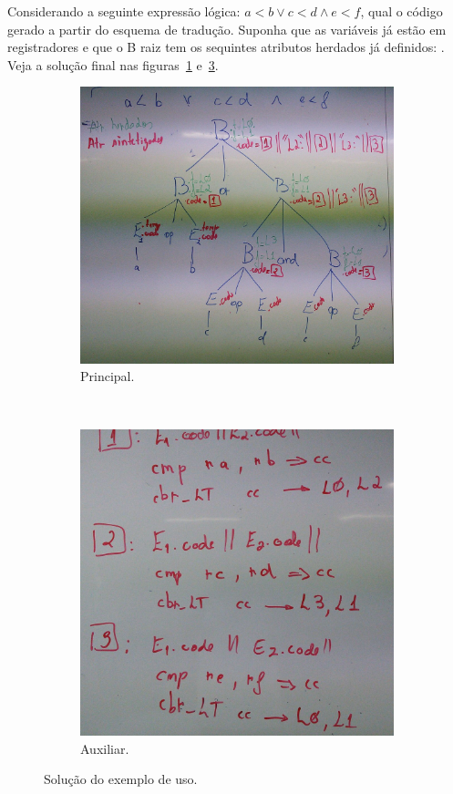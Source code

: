 \documentclass{compiladores}
\begin{document}
Considerando a seguinte expressão lógica: $a<b \lor c<d \land e<f$,
qual o código gerado a partir do esquema de tradução. Suponha que as
variáveis já estão em registradores e que o B raiz tem os sequintes
atributos herdados já definidos: . Veja a
solução final nas figuras~\ref{70-fig1} e~\ref{70-fig2}.

\begin{figure}[!htb]
  \centering
  \begin{subfigure}[b]{.57\textwidth}
    \centering
    \includegraphics[width=\linewidth]{img/70-1.jpg}
    \caption{Principal.}
    \label{70-fig1}
  \end{subfigure}
  ~
  \begin{subfigure}[b]{.4\textwidth}
    \centering
    \includegraphics[width=\linewidth]{img/70-2.jpg}
    \caption{Auxiliar.}
    \label{70-fig2}
  \end{subfigure}
  \caption{Solução do exemplo de uso.}
\end{figure}
\end{document}
